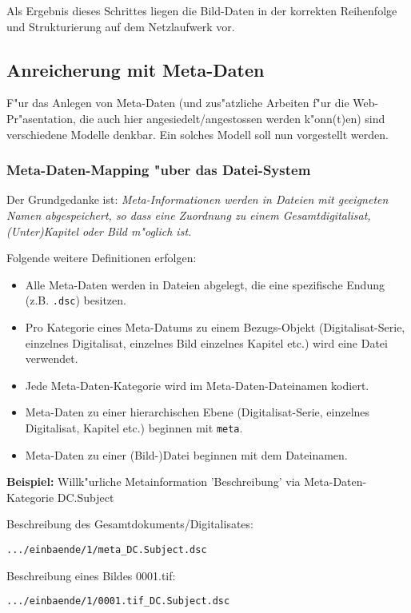 \documentclass[11pt, twoside, a4paper, BCOR8mm, DIV12, bibtotoc,idxtotoc]{scrreprt}
\begin{document}
Als Ergebnis dieses Schrittes liegen die Bild-Daten in der korrekten
Reihenfolge und Strukturierung auf dem Netzlaufwerk vor.


\subsection{Anreicherung mit Meta-Daten}

F"ur das Anlegen von Meta-Daten (und zus"atzliche Arbeiten f"ur die
Web-Pr"asentation, die auch hier angesiedelt/angestossen werden
k"onn(t)en) sind verschiedene Modelle denkbar. Ein solches Modell soll
nun vorgestellt werden.


\subsubsection{Meta-Daten-Mapping "uber das Datei-System}

Der Grundgedanke ist: \emph{Meta-Informationen werden in Dateien mit
  geeigneten Namen abgespeichert, so dass eine Zuordnung zu einem
  Gesamtdigitalisat, (Unter)Kapitel oder Bild m"oglich ist.}

Folgende weitere Definitionen erfolgen:

\begin{itemize}
\item Alle Meta-Daten werden in Dateien abgelegt, die eine spezifische
  Endung (z.B. \texttt{.dsc}) besitzen.
\item Pro Kategorie eines Meta-Datums zu einem Bezugs-Objekt
  (Digitalisat-Serie, einzelnes Digitalisat, einzelnes Bild einzelnes
  Kapitel etc.) wird eine Datei verwendet.
\item Jede Meta-Daten-Kategorie wird im Meta-Daten-Dateinamen
  kodiert. 
\item Meta-Daten zu einer hierarchischen Ebene (Digitalisat-Serie, einzelnes
Digitalisat, Kapitel etc.) beginnen mit \texttt{meta}.
\item Meta-Daten zu einer (Bild-)Datei beginnen mit dem Dateinamen.
\end{itemize}

\textbf{Beispiel:} Willk"urliche Metainformation 'Beschreibung' via
Meta-Daten-Kategorie DC.Subject

Beschreibung des Gesamtdokuments/Digitalisates:
\begin{verbatim}
.../einbaende/1/meta_DC.Subject.dsc 
\end{verbatim}

Beschreibung eines Bildes 0001.tif:
\begin{verbatim}
.../einbaende/1/0001.tif_DC.Subject.dsc
\end{verbatim}
\end{document}
